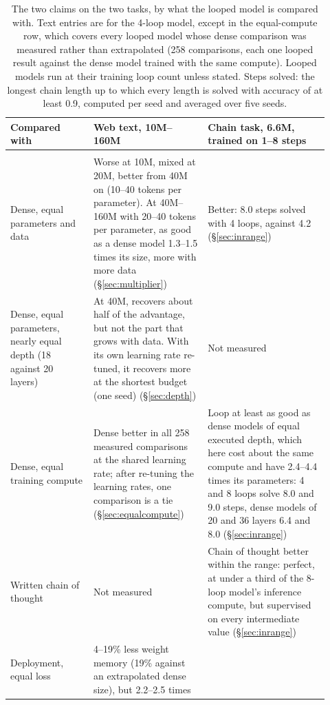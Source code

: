 \begin{table}[t]
  \centering
  \caption{The two claims on the two tasks, by what the looped model is compared with. Text entries are for the 4-loop model, except in the equal-compute row, which covers every looped model whose dense comparison was measured rather than
  extrapolated (258 comparisons, each one looped result against the dense model trained with the same compute). Looped models run at their training loop
  count unless stated. Steps solved: the longest chain length up to which every length is solved with accuracy of at
  least 0.9, computed per seed and averaged over five seeds.}
  \label{tab:summary}
  \footnotesize
  \begin{tabular}{>{\raggedright\arraybackslash}p{0.24\linewidth}p{0.33\linewidth}p{0.35\linewidth}}
    \toprule
    Compared with & Web text, 10M--160M & Chain task, 6.6M, trained on 1--8 steps \\
    \midrule
    \multicolumn{3}{l}{\emph{Claim one: a looped model behaves like a larger one}} \\
    Dense, equal parameters and data & Worse at 10M, mixed at 20M, better from 40M on (10--40 tokens per parameter).
    At 40M--160M with 20--40 tokens per parameter, as good as a dense model 1.3--1.5 times its size, more with more data (\S\ref{sec:multiplier}) & Better: 8.0 steps solved with 4 loops, against 4.2 (\S\ref{sec:inrange}) \\
    Dense, equal parameters, nearly equal depth (18 against 20 layers) & At 40M, recovers about half of the advantage, but not the part that grows with data. With its own learning rate re-tuned, it recovers more at
    the shortest budget (one seed)
    (\S\ref{sec:depth}) & Not measured \\
    Dense, equal training compute & Dense better in all 258 measured comparisons at the shared learning rate; after re-tuning the learning rates, one
    comparison is a tie (\S\ref{sec:equalcompute}) & Loop at least as good as dense models of
    equal executed depth, which here cost about the same compute and have 2.4--4.4 times its parameters: 4 and 8 loops
    solve 8.0 and 9.0 steps, dense models of 20 and 36 layers 6.4 and 8.0 (\S\ref{sec:inrange}) \\
    Written chain of thought & Not measured & Chain of thought better within the range: perfect, at under a third of the
    8-loop model's inference compute, but supervised on every intermediate value (\S\ref{sec:inrange}) \\
    Deployment, equal loss & 4--19\% less weight memory (19\% against an extrapolated dense size), but 2.2--2.5 times

\end{tabular}
\end{table}
